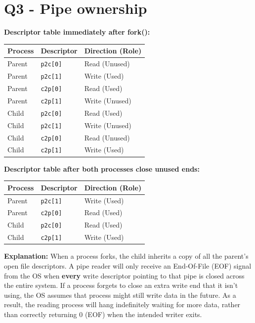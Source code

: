 \documentclass[11pt,a4paper]{article}
\begin{document}
\section*{Q3 - Pipe ownership}
\textbf{Descriptor table immediately after fork():}
\begin{center}
\begin{tabularx}{0.8\textwidth}{@{}lll@{}}
\toprule
\textbf{Process} & \textbf{Descriptor} & \textbf{Direction (Role)} \\
\midrule
Parent & \texttt{p2c[0]} & Read (Unused) \\
Parent & \texttt{p2c[1]} & Write (Used) \\
Parent & \texttt{c2p[0]} & Read (Used) \\
Parent & \texttt{c2p[1]} & Write (Unused) \\
Child  & \texttt{p2c[0]} & Read (Used) \\
Child  & \texttt{p2c[1]} & Write (Unused) \\
Child  & \texttt{c2p[0]} & Read (Unused) \\
Child  & \texttt{c2p[1]} & Write (Used) \\
\bottomrule
\end{tabularx}
\end{center}

\textbf{Descriptor table after both processes close unused ends:}
\begin{center}
\begin{tabularx}{0.8\textwidth}{@{}lll@{}}
\toprule
\textbf{Process} & \textbf{Descriptor} & \textbf{Direction (Role)} \\
\midrule
Parent & \texttt{p2c[1]} & Write (Used) \\
Parent & \texttt{c2p[0]} & Read (Used) \\
Child  & \texttt{p2c[0]} & Read (Used) \\
Child  & \texttt{c2p[1]} & Write (Used) \\
\bottomrule
\end{tabularx}
\end{center}

\textbf{Explanation:} 
When a process forks, the child inherits a copy of all the parent's open file descriptors. A pipe reader will only receive an End-Of-File (EOF) signal from the OS when \textbf{every} write descriptor pointing to that pipe is closed across the entire system. If a process forgets to close an extra write end that it isn't using, the OS assumes that process might still write data in the future. As a result, the reading process will hang indefinitely waiting for more data, rather than correctly returning 0 (EOF) when the intended writer exits.
\end{document}
